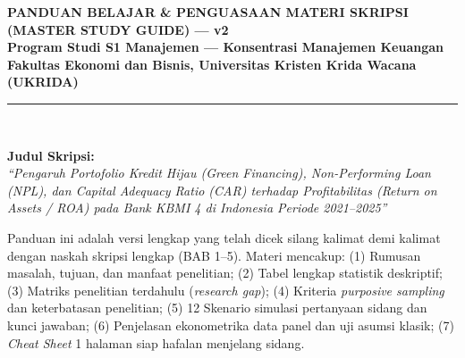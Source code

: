 \documentclass[11pt,a4paper]{article}
\begin{document}
\begin{center}
    \vspace*{0.5cm}
    {\Huge \textbf{\color{primaryBlue}PANDUAN BELAJAR \& PENGUASAAN MATERI SKRIPSI}}\\[0.3cm]
    {\Large \textbf{\color{secondaryBlue}(MASTER STUDY GUIDE) --- v2}}\\[0.2cm]
    {\normalsize \textbf{\color{darkText}Program Studi S1 Manajemen --- Konsentrasi Manajemen Keuangan}}\\[0.1cm]
    {\normalsize \textbf{\color{accentTeal}Fakultas Ekonomi dan Bisnis, Universitas Kristen Krida Wacana (UKRIDA)}}\\[0.6cm]
    \rule{\linewidth}{1.5pt}\\[0.4cm]
\end{center}

\begin{tcolorbox}[colback=lightBg, colframe=primaryBlue, arc=4pt, boxrule=1pt]
    \textbf{\color{primaryBlue}Judul Skripsi:}\\
    \textit{\large ``Pengaruh Portofolio Kredit Hijau (\textit{Green Financing}), \textit{Non-Performing Loan} (NPL), dan \textit{Capital Adequacy Ratio} (CAR) terhadap Profitabilitas (\textit{Return on Assets} / ROA) pada Bank KBMI 4 di Indonesia Periode 2021--2025''}
\end{tcolorbox}

\begin{tipbox}
    Panduan ini adalah versi lengkap yang telah dicek silang kalimat demi kalimat dengan naskah skripsi lengkap (BAB 1--5). Materi mencakup:
    (1) Rumusan masalah, tujuan, dan manfaat penelitian; 
    (2) Tabel lengkap statistik deskriptif; 
    (3) Matriks penelitian terdahulu (\textit{research gap}); 
    (4) Kriteria \textit{purposive sampling} dan keterbatasan penelitian; 
    (5) 12 Skenario simulasi pertanyaan sidang dan kunci jawaban; 
    (6) Penjelasan ekonometrika data panel dan uji asumsi klasik; 
    (7) \textit{Cheat Sheet} 1 halaman siap hafalan menjelang sidang.
\end{tipbox}

\vspace{0.4cm}
\tableofcontents
\newpage

\end{document}
